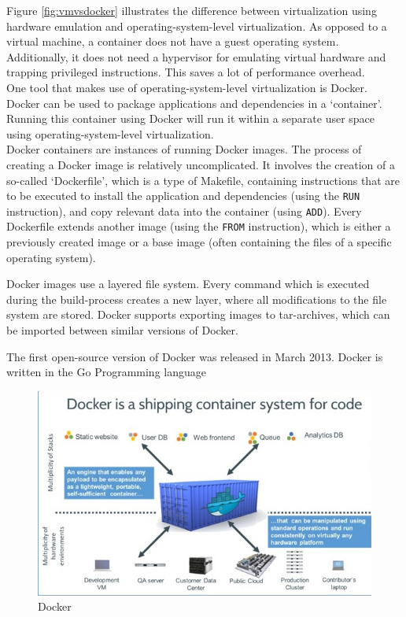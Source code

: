 Figure \ref{fig:vmvsdocker} illustrates the difference between virtualization using hardware emulation and operating-system-level virtualization. As opposed to a virtual machine, a container does not have a guest operating system. Additionally, it does not need a hypervisor for emulating virtual hardware and trapping privileged instructions. This saves a lot of performance overhead. \\

One tool that makes use of operating-system-level virtualization is Docker. Docker can be used to package applications and dependencies in a `container'. Running this container using Docker will run it within a separate user space using operating-system-level virtualization. \\
Docker containers are instances of running Docker images. The process of creating a Docker image is relatively uncomplicated. It involves the creation of a so-called `Dockerfile', which is a type of Makefile, containing instructions that are to be executed to install the application and dependencies (using the \verb|RUN| instruction), and copy relevant data into the container (using \verb|ADD|). Every Dockerfile extends another image (using the \verb|FROM| instruction), which is either a previously created image or a base image (often containing the files of a specific operating system).

Docker images use a layered file system. Every command which is executed during the
build-process creates a new layer, where all modifications to the file system are stored.
Docker supports exporting images to tar-archives, which can be imported between similar versions of Docker.

The first open-source version of Docker was released in March 2013. Docker is written in the Go Programming language \\




\begin{figure}[H]
\centering
\includegraphics[scale=0.8]{images/docker_container.jpeg}
\caption{Docker}
\label{fig:analysis-mvc}
\end{figure}

